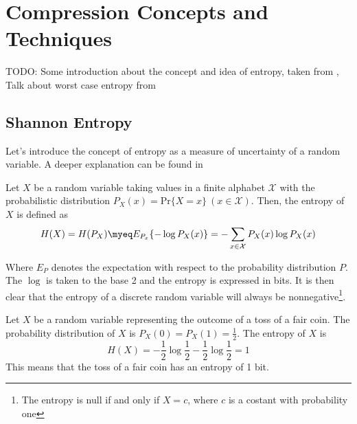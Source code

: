 
\chapter{Compression Concepts and Techniques} %

\label{ch:Chapter2} %

TODO: Some introduction about the concept and idea of entropy, taken from \cite{Shannon1948,navarro2016compact,han2002mathematics}, Talk about worst case entropy from \cite{navarro2016compact}

\section{Shannon Entropy} \label{sec:shannon_entropy}

Let's introduce the concept of entropy as a measure of uncertainty of a random variable. A deeper explanation can be found in \cite{han2002mathematics,navarro2016compact,ElementsofInformationTheory}

\begin{definition}\label{def:entropy}
    Let $X$ be a random variable taking values in a finite alphabet $\mathcal{X}$ with the probabilistic distribution $P_X(x)= \text{Pr}\{X=x\}~(x\in\mathcal{X})$. Then, the entropy of $X$ is defined as
    \begin{equation}
        H(X) = H(P_X) \myeq E_{P_x} \{-\log P_X(x)\} = -\sum_{x\in\mathcal{X}} P_X(x)\log P_X(x)
    \end{equation}
\end{definition}
\noindent Where $E_P$ denotes the expectation with respect to the probability distribution $P$. The $\log$ is taken to the base 2 and the entropy is expressed in bits. It is then clear that the entropy of a discrete random variable will always be nonnegative\footnote{The entropy is null if and only if $X = c$, where $c$ is a costant with probability one}.

\begin{example}
    Let $X$ be a random variable representing the outcome of a toss of a fair coin. The probability distribution of $X$ is $P_X(0) = P_X(1) = \frac{1}{2}$. The entropy of $X$ is
    \begin{equation}
        H(X) = -\frac{1}{2}\log\frac{1}{2} - \frac{1}{2}\log\frac{1}{2} = 1
    \end{equation}
    This means that the toss of a fair coin has an entropy of 1 bit.
\end{example}

